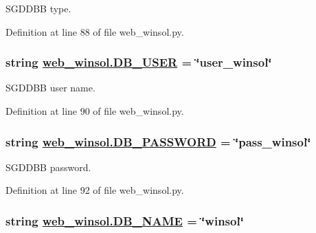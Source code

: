SGDDBB type. 



Definition at line 88 of file web\_\-winsol.py.\hypertarget{namespaceweb__winsol_2682f1bde5835a4b30d041417934f22d}{
\subsubsection[DB\_\-USER]{\setlength{\rightskip}{0pt plus 5cm}string \hyperlink{namespaceweb__winsol_2682f1bde5835a4b30d041417934f22d}{web\_\-winsol.DB\_\-USER} = \char`\"{}user\_\-winsol\char`\"{}}}
\label{namespaceweb__winsol_2682f1bde5835a4b30d041417934f22d}


SGDDBB user name. 



Definition at line 90 of file web\_\-winsol.py.\hypertarget{namespaceweb__winsol_4df7e3e505b5053643297de45f37279c}{
\subsubsection[DB\_\-PASSWORD]{\setlength{\rightskip}{0pt plus 5cm}string \hyperlink{namespaceweb__winsol_4df7e3e505b5053643297de45f37279c}{web\_\-winsol.DB\_\-PASSWORD} = \char`\"{}pass\_\-winsol\char`\"{}}}
\label{namespaceweb__winsol_4df7e3e505b5053643297de45f37279c}


SGDDBB password. 



Definition at line 92 of file web\_\-winsol.py.\hypertarget{namespaceweb__winsol_5b04722a983ed37fc2169504bb5b1274}{
\subsubsection[DB\_\-NAME]{\setlength{\rightskip}{0pt plus 5cm}string \hyperlink{namespaceweb__winsol_5b04722a983ed37fc2169504bb5b1274}{web\_\-winsol.DB\_\-NAME} = \char`\"{}winsol\char`\"{}}}
\label{namespaceweb__winsol_5b04722a983ed37fc2169504bb5b1274}



